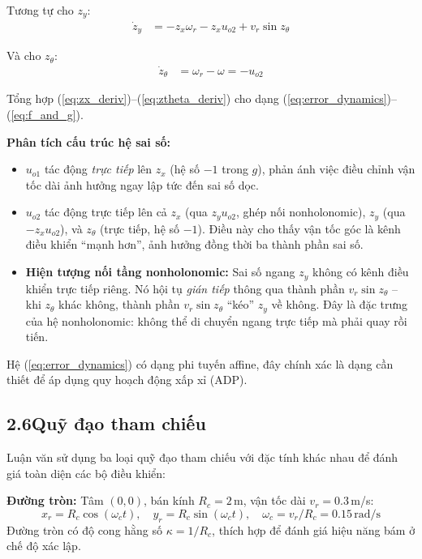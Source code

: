 \documentclass[12pt,a4paper]{article}
\begin{document}
Tương tự cho $z_y$:
\begin{align}
    \dot{z}_y &= -z_x\omega_r - z_x u_{o2} + v_r\sin z_\theta \label{eq:zy_deriv}
\end{align}

Và cho $z_\theta$:
\begin{align}
    \dot{z}_\theta &= \omega_r - \omega = -u_{o2} \label{eq:ztheta_deriv}
\end{align}

Tổng hợp (\ref{eq:zx_deriv})--(\ref{eq:ztheta_deriv}) cho dạng (\ref{eq:error_dynamics})--(\ref{eq:f_and_g}).

\textbf{Phân tích cấu trúc hệ sai số:}

\begin{itemize}
    \item $u_{o1}$ tác động \textit{trực tiếp} lên $z_x$ (hệ số $-1$ trong $g$), phản ánh việc điều chỉnh vận tốc dài ảnh hưởng ngay lập tức đến sai số dọc.

    \item $u_{o2}$ tác động trực tiếp lên cả $z_x$ (qua $z_y u_{o2}$, ghép nối nonholonomic), $z_y$ (qua $-z_x u_{o2}$), và $z_\theta$ (trực tiếp, hệ số $-1$). Điều này cho thấy vận tốc góc là kênh điều khiển ``mạnh hơn'', ảnh hưởng đồng thời ba thành phần sai số.

    \item \textbf{Hiện tượng nối tầng nonholonomic:} Sai số ngang $z_y$ không có kênh điều khiển trực tiếp riêng. Nó hội tụ \textit{gián tiếp} thông qua thành phần $v_r\sin z_\theta$ -- khi $z_\theta$ khác không, thành phần $v_r\sin z_\theta$ ``kéo'' $z_y$ về không. Đây là đặc trưng của hệ nonholonomic: không thể di chuyển ngang trực tiếp mà phải quay rồi tiến.
\end{itemize}

Hệ (\ref{eq:error_dynamics}) có dạng phi tuyến affine, đây chính xác là dạng cần thiết để áp dụng quy hoạch động xấp xỉ (ADP).

\subsection*{2.6\quad Quỹ đạo tham chiếu}

Luận văn sử dụng ba loại quỹ đạo tham chiếu với đặc tính khác nhau để đánh giá toàn diện các bộ điều khiển:

\textbf{Đường tròn:} Tâm $(0, 0)$, bán kính $R_c = 2$\,m, vận tốc dài $v_r = 0.3$\,m/s:
\begin{equation}\label{eq:ref_circle}
    x_r = R_c\cos(\omega_c t), \quad y_r = R_c\sin(\omega_c t), \quad \omega_c = v_r/R_c = 0.15\,\text{rad/s}
\end{equation}
Đường tròn có độ cong hằng số $\kappa = 1/R_c$, thích hợp để đánh giá hiệu năng bám ở chế độ xác lập.
\end{document}
